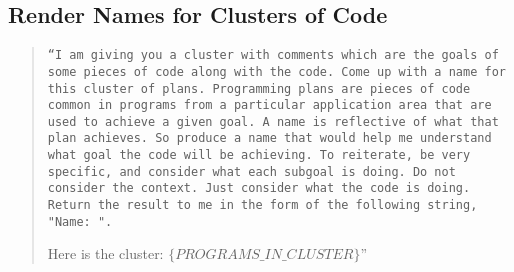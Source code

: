 \subsection{Render Names for Clusters of Code}
\label{sec:name_prompt}


\begin{quote}
    \tt ``I am giving you a cluster with comments which are the goals of some pieces of code along with the code. Come up with a name for this cluster of plans. Programming plans are pieces of code common in programs from a particular application area that are used to achieve a given goal. A name is reflective of what that plan achieves. So produce a name that would help me understand what goal the code  will be achieving. To reiterate, be very specific, and consider what each subgoal is doing. Do not consider the context. Just consider what the code is doing. Return the result to me in the form of the following string, "Name: ". 
    
    Here is the cluster: $\{PROGRAMS\_IN\_CLUSTER\}$''
\end{quote}
